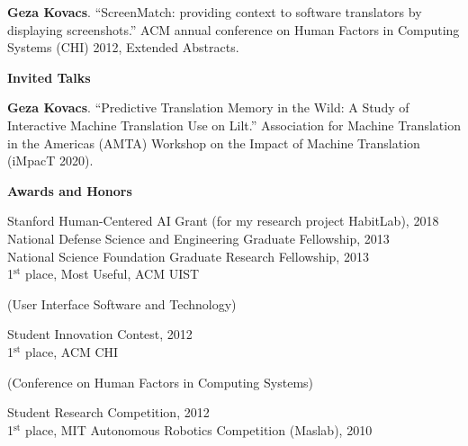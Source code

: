 \documentclass[10pt,A4]{article}
\newcommand{\cvsection}[1]
{
	\begin{center}
		\large\textcolor{sectcol}{\textbf{#1}}
	\end{center}
}
\begin{document}
\textbf{Geza Kovacs}. ``ScreenMatch: providing context to software translators by displaying screenshots.'' ACM annual conference on Human Factors in Computing Systems (CHI) 2012, Extended Abstracts.\\ %


\cvsection{Invited Talks}

\textbf{Geza Kovacs}. ``Predictive Translation Memory in the Wild: A Study of Interactive Machine Translation Use on Lilt.'' Association for Machine Translation in the Americas (AMTA) Workshop on the Impact of Machine Translation (iMpacT 2020).\\

\pagebreak

\cvsection{Awards and Honors}

Stanford Human-Centered AI Grant (for my research project HabitLab), 2018\\ %
National Defense Science and Engineering Graduate Fellowship, 2013\\ %
National Science Foundation Graduate Research Fellowship, 2013\\ %
1$^{\textrm{st}}$ place, Most Useful, ACM UIST \begin{small}(User Interface Software and Technology)\end{small} Student Innovation Contest, 2012\\
1$^{\textrm{st}}$ place, ACM CHI \begin{small}(Conference on Human Factors in Computing Systems)\end{small} Student Research Competition, 2012\\
1$^{\textrm{st}}$ place, MIT Autonomous Robotics Competition (Maslab), 2010
\end{document}
